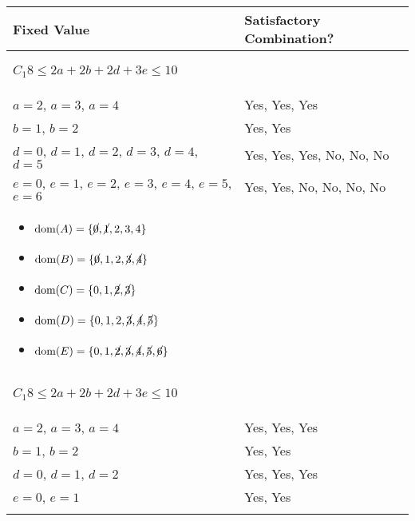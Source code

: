 \begin{example}
    \begin{center}
        \begin{tabular}{ll}
            \textbf{Fixed Value} & \textbf{Satisfactory Combination?} \\
            \toprule
            \multicolumn{2}{p{\linewidth}}{
            \begin{center}
                $C_1 8 \leq 2a + 2b + 2d + 3e \leq 10$
            \end{center}} \\
            \midrule
                $a=2$, $a=3$, $a=4$ & Yes, Yes, Yes \\
                $b=1$, $b=2$ & Yes, Yes \\
                $d=0$, $d=1$, $d=2$, $d=3$, $d=4$, $d=5$ & Yes, Yes, Yes, No, No, No \\
                $e=0$, $e=1$, $e=2$, $e=3$, $e=4$, $e=5$, $e=6$ & Yes, Yes, No, No, No, No \\
            \multicolumn{2}{p{\linewidth}}{
            \begin{itemize}
                \item $\text{dom}(A) = \{\cancel{0}, \cancel{1}, 2, 3, 4\}$
                \item $\text{dom}(B) = \{\cancel{0}, 1, 2, \cancel{3}, \cancel{4}\} $
                \item $\text{dom}(C) = \{0, 1, \cancel{2}, \cancel{3}\} $
                \item $\text{dom}(D) = \{0, 1, 2, \cancel{3}, \cancel{4}, \cancel{5}\} $
                \item $\text{dom}(E) = \{0, 1, \cancel{2}, \cancel{3}, \cancel{4}, \cancel{5}, \cancel{6}\} $
            \end{itemize}} \\
            \midrule
            \multicolumn{2}{p{\linewidth}}{
            \begin{center}
                $C_1 8 \leq 2a + 2b + 2d + 3e \leq 10$
            \end{center}} \\
            \midrule
                $a=2$, $a=3$, $a=4$ & Yes, Yes, Yes \\
                $b=1$, $b=2$ & Yes, Yes \\
                $d=0$, $d=1$, $d=2$ & Yes, Yes, Yes\\
                $e=0$, $e=1$ & Yes, Yes \\
            \multicolumn{2}{p{\linewidth}}{
}
\end{tabular}
\end{center}
\end{example}
